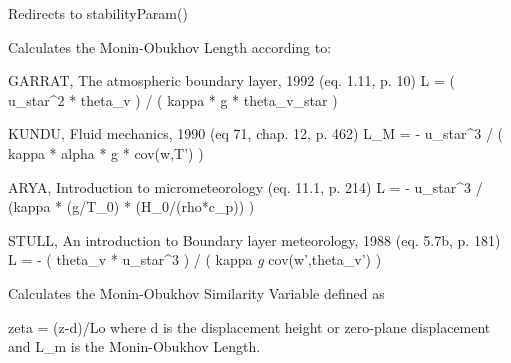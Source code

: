 \documentclass[a4paper,10pt,oneside]{sphinxmanual}
\begin{document}
\begin{fulllineitems}
\label{pymicra.micro:pymicra.micro.scales.MonObuVar}
Redirects to stabilityParam()

\end{fulllineitems}


\begin{fulllineitems}
\label{pymicra.micro:pymicra.micro.scales.obukhovLen}
Calculates the Monin-Obukhov Length
according to:

GARRAT, The atmospheric boundary layer, 1992 (eq. 1.11, p. 10)
L = ( u\_star\textasciicircum{}2 * theta\_v ) / ( kappa * g * theta\_v\_star )

KUNDU, Fluid mechanics, 1990 (eq 71, chap. 12, p. 462)
L\_M = - u\_star\textasciicircum{}3 / ( kappa * alpha * g * cov(w,T') )

ARYA, Introduction to micrometeorology (eq. 11.1, p. 214)
L = - u\_star\textasciicircum{}3 / (kappa * (g/T\_0) * (H\_0/(rho*c\_p)) )

STULL, An introduction to Boundary layer meteorology, 1988 (eq. 5.7b, p. 181)
L = - ( theta\_v * u\_star\textasciicircum{}3 ) / ( kappa \emph{g} cov(w',theta\_v') )

\end{fulllineitems}


\begin{fulllineitems}
\label{pymicra.micro:pymicra.micro.scales.stabilityParam}
Calculates the Monin-Obukhov Similarity Variable
defined as

zeta = (z-d)/Lo
where d is the displacement height or zero-plane displacement
and L\_m is the Monin-Obukhov Length.

\end{fulllineitems}

\end{document}
